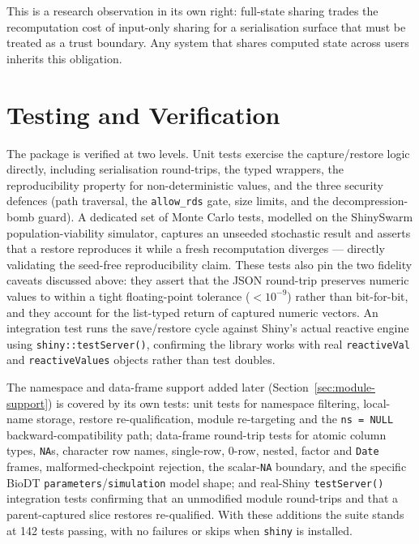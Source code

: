 \documentclass[11pt,a4paper]{article}
\begin{document}
This is a research observation in its own right: full-state sharing trades the
recomputation cost of input-only sharing for a serialisation surface that must
be treated as a trust boundary. Any system that shares computed state across
users inherits this obligation.

\section{Testing and Verification}
\label{sec:testing}

The package is verified at two levels. Unit tests exercise the capture/restore
logic directly, including serialisation round-trips, the typed wrappers, the
reproducibility property for non-deterministic values, and the three security
defences (path traversal, the \texttt{allow\_rds} gate, size limits, and the
decompression-bomb guard). A dedicated set of Monte Carlo tests, modelled on the
ShinySwarm population-viability simulator, captures an unseeded stochastic result
and asserts that a restore reproduces it while a fresh recomputation diverges ---
directly validating the seed-free reproducibility claim. These tests also pin the
two fidelity caveats discussed above: they assert that the JSON round-trip
preserves numeric values to within a tight floating-point tolerance ($<10^{-9}$)
rather than bit-for-bit, and they account for the list-typed return of captured
numeric vectors. An integration test runs the save/restore cycle against Shiny's
actual reactive engine using \texttt{shiny::testServer()}, confirming the library
works with real \texttt{reactiveVal} and \texttt{reactiveValues} objects rather
than test doubles.

The namespace and data-frame support added later
(Section~\ref{sec:module-support}) is covered by its own tests: unit tests for
namespace filtering, local-name storage, restore re-qualification, module
re-targeting and the \texttt{ns = NULL} backward-compatibility path; data-frame
round-trip tests for atomic column types, \texttt{NA}s, character row names,
single-row, 0-row, nested, factor and \texttt{Date} frames, malformed-checkpoint
rejection, the scalar-\texttt{NA} boundary, and the specific BioDT
\texttt{parameters}/\texttt{simulation} model shape; and real-Shiny
\texttt{testServer()} integration tests confirming that an unmodified module
round-trips and that a parent-captured slice restores re-qualified. With these
additions the suite stands at 142 tests passing, with no failures or skips when
\texttt{shiny} is installed.
\end{document}
